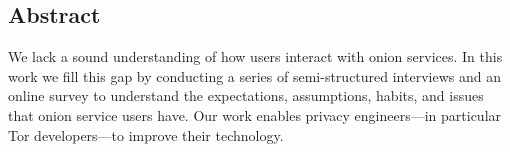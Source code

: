 \subsection*{Abstract}
We lack a sound understanding of how users interact with onion services.
In this work we fill this gap by conducting a series of semi-structured
interviews and an online survey to understand the expectations, assumptions,
habits, and issues that onion service users have.
Our work enables privacy engineers---in particular Tor developers---to improve
their technology.
